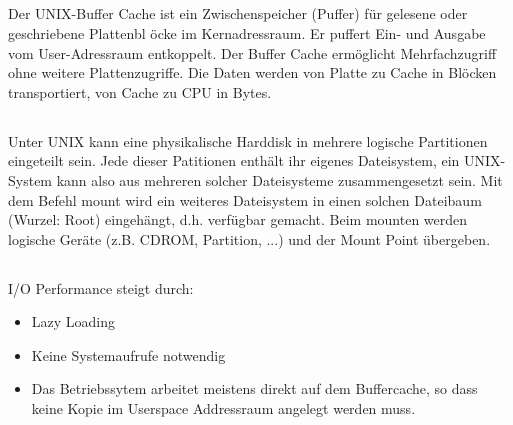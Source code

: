 \subsection{}
\begin{answer}
Der UNIX-Buffer Cache ist ein Zwischenspeicher (Puffer) für gelesene oder geschriebene Plattenbl
öcke im Kernadressraum. Er puffert Ein- und Ausgabe vom User-Adressraum entkoppelt. Der
Buffer Cache ermöglicht Mehrfachzugriff ohne weitere Plattenzugriffe.
Die Daten werden von Platte zu Cache in Blöcken transportiert, von Cache zu CPU in Bytes.
\end{answer}

\subsection{}
\begin{answer}
Unter UNIX kann eine physikalische Harddisk in mehrere logische Partitionen eingeteilt sein. Jede
dieser Patitionen enthält ihr eigenes Dateisystem, ein UNIX-System kann also aus mehreren solcher
Dateisysteme zusammengesetzt sein. Mit dem Befehl mount wird ein weiteres Dateisystem
in einen solchen Dateibaum (Wurzel: Root) eingehängt, d.h. verfügbar gemacht. Beim mounten
werden logische Geräte (z.B. CDROM, Partition, ...) und der Mount Point übergeben.
\end{answer}

\subsection{}
\begin{answer}
I/O Performance steigt durch:

\begin{itemize}
\item Lazy Loading 
\item Keine Systemaufrufe notwendig
\item Das Betriebssytem arbeitet meistens direkt auf dem Buffercache, so dass keine Kopie im Userspace Addressraum angelegt werden muss.
\end{itemize}

\end{answer}

